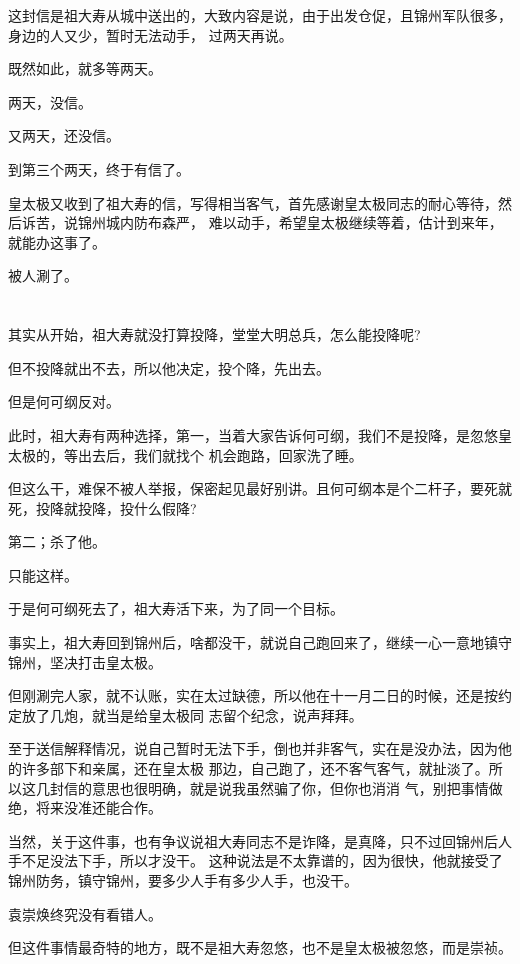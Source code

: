 \documentclass[11pt,a4paper,onecolumn]{article}
\begin{document}
这封信是祖大寿从城中送出的，大致内容是说，由于出发仓促，且锦州军队很多，身边的人又少，暂时无法动手，
过两天再说。

既然如此，就多等两天。

两天，没信。

又两天，还没信。

到第三个两天，终于有信了。

皇太极又收到了祖大寿的信，写得相当客气，首先感谢皇太极同志的耐心等待，然后诉苦，说锦州城内防布森严，
难以动手，希望皇太极继续等着，估计到来年，就能办这事了。

被人涮了。

\section[\thesection]{}

其实从开始，祖大寿就没打算投降，堂堂大明总兵，怎么能投降呢?

但不投降就出不去，所以他决定，投个降，先出去。

但是何可纲反对。

此时，祖大寿有两种选择，第一，当着大家告诉何可纲，我们不是投降，是忽悠皇太极的，等出去后，我们就找个
机会跑路，回家洗了睡。

但这么干，难保不被人举报，保密起见最好别讲。且何可纲本是个二杆子，要死就死，投降就投降，投什么假降?

第二；杀了他。

只能这样。

于是何可纲死去了，祖大寿活下来，为了同一个目标。

事实上，祖大寿回到锦州后，啥都没干，就说自己跑回来了，继续一心一意地镇守锦州，坚决打击皇太极。

但刚涮完人家，就不认账，实在太过缺德，所以他在十一月二日的时候，还是按约定放了几炮，就当是给皇太极同
志留个纪念，说声拜拜。

至于送信解释情况，说自己暂时无法下手，倒也并非客气，实在是没办法，因为他的许多部下和亲属，还在皇太极
那边，自己跑了，还不客气客气，就扯淡了。所以这几封信的意思也很明确，就是说我虽然骗了你，但你也消消
气，别把事情做绝，将来没准还能合作。

当然，关于这件事，也有争议说祖大寿同志不是诈降，是真降，只不过回锦州后人手不足没法下手，所以才没干。
这种说法是不太靠谱的，因为很快，他就接受了锦州防务，镇守锦州，要多少人手有多少人手，也没干。

袁崇焕终究没有看错人。

但这件事情最奇特的地方，既不是祖大寿忽悠，也不是皇太极被忽悠，而是崇祯。
\end{document}
